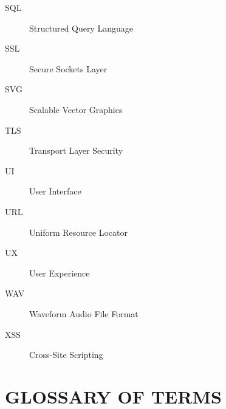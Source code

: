 \documentclass[12pt, a4paper, oneside]{book}
\begin{document}
\begin{description}
    \item[SQL] Structured Query Language
    \item[SSL] Secure Sockets Layer
    \item[SVG] Scalable Vector Graphics
    \item[TLS] Transport Layer Security
    \item[UI] User Interface
    \item[URL] Uniform Resource Locator
    \item[UX] User Experience
    \item[WAV] Waveform Audio File Format
    \item[XSS] Cross-Site Scripting
\end{description}

\chapter{GLOSSARY OF TERMS}
\end{document}
